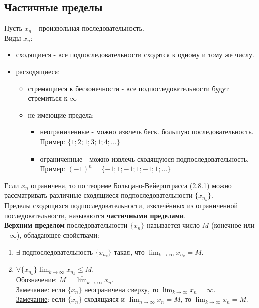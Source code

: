 \documentclass[12pt]{article}
\begin{document}
    \subsection{Частичные пределы}
    \noindent Пусть $x_n$ - произвольная последовательность.\\
    Виды $x_n$:
    \begin{itemize}
        \item сходящиеся - все подпоследовательности сходятся к одному и тому же числу.
        \item расходящиеся:
              \begin{itemize}
                \item стремящиеся к бесконечности - все подпоследовательности будут стремиться к $\infty$
                \item не имеющие предела:
                      \begin{itemize}
                        \item неограниченные - можно извлечь беск. большую последовательность.\\Пример: $\{1; 2; 1; 3; 1; 4; \dots\}$
                        \item ограниченные - можно извлечь сходящуюся подпоследовательность.\\Пример: $(-1)^n = \{-1; 1; -1; 1; -1; 1; \dots\}$
                      \end{itemize}
              \end{itemize}
    \end{itemize}
    Если $x_n$ ограничена, то по \hyperref[th:2.8.1]{теореме Больцано-Вейерштрасса (2.8.1)} можно рассматривать различные сходящиеся подпоследовательности $\{x_{n_{k}}\}$.\\
    Пределы сходящихся подпоследовательности, извлечённых из ограниченной последовательности, называются \textbf{частичными пределами}.\\
    \textbf{Верхним пределом} последовательности $\{x_n\}$ называется число $M$ (конечное или $\pm \infty$), обладающее свойствами:
    \begin{enumerate}
        \item $\exists$ подпоследовательность $\{x_{n_{k}}\}$ такая, что $\lim_{k\to\infty}x_{n_{k}} = M$.
        \item $\forall \{x_{n_{k}}\} \lim_{k\to\infty} x_{n_{k}} \le M$.\\
        Обозначение: $M = \overline{\lim}_{k\to\infty}x_n$.\\
        \underline{Замечание}: если $\{x_n\}$ неограничена сверху, то $\overline{\lim}_{k\to\infty}x_n = \infty$.\\
        \underline{Замечание}: если $\{x_n\}$ сходящаяся и $\lim_{n\to\infty} x_n = M$, то $\overline{\lim}_{k\to\infty}x_n = M$.
    \end{enumerate}
\end{document}
